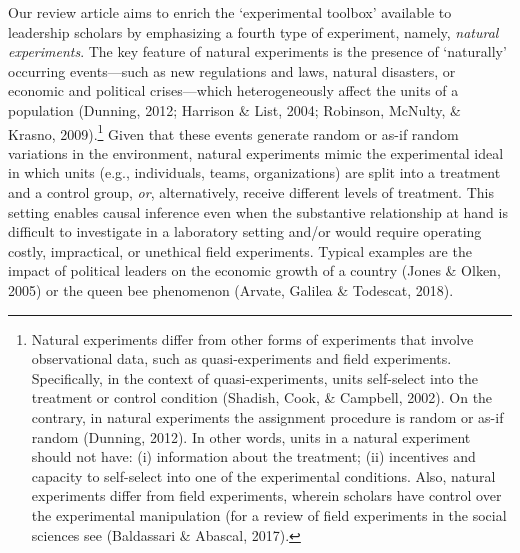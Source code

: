 \documentclass[english]{article}
\begin{document}
Our review article aims to enrich the `experimental toolbox' available
to leadership scholars by emphasizing a fourth type of experiment,
namely, \emph{natural experiments}. The key feature of natural
experiments is the presence of `naturally' occurring events---such as
new regulations and laws, natural disasters, or economic and political
crises---which heterogeneously affect the units of a population
(Dunning, 2012; Harrison \& List, 2004; Robinson, McNulty, \& Krasno,
2009).\footnote{Natural experiments differ from other forms of
experiments that involve observational data, such as quasi-experiments
and field experiments. Specifically, in the context of
quasi-experiments, units self-select into the treatment or control
condition (Shadish, Cook, \& Campbell, 2002). On the contrary, in
natural experiments the assignment procedure is random or as-if random
(Dunning, 2012). In other words, units in a natural experiment should
not have: (i) information about the treatment; (ii) incentives and
capacity to self-select into one of the experimental conditions. Also,
natural experiments differ from field experiments, wherein scholars
have control over the experimental manipulation (for a review of field
experiments in the social sciences see (Baldassari \& Abascal, 2017).}
Given that these events generate random or as-if random variations in
the environment, natural experiments mimic the experimental ideal in
which units (e.g., individuals, teams, organizations) are split into a
treatment and a control group, \emph{or}, alternatively, receive
different levels of treatment. This setting enables causal inference
even when the substantive relationship at hand is difficult to
investigate in a laboratory setting and/or would require operating
costly, impractical, or unethical field experiments. Typical examples
are the impact of political leaders on the economic growth of a country
(Jones \& Olken, 2005) or the queen bee phenomenon (Arvate, Galilea \&
Todescat, 2018).
\end{document}

